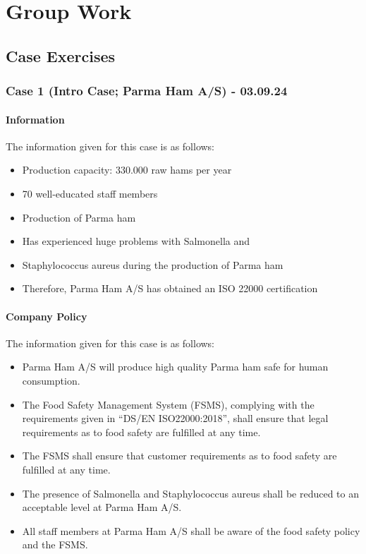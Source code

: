 \chapter{Group Work}

\section{Case Exercises}

\subsection{Case 1 (Intro Case; Parma Ham A/S) - 03.09.24}

\subsubsection*{Information}
\begin{highlight}
    The information given for this case is as follows:

\begin{itemize}
\item Production capacity: 330.000 raw hams per year
\item 70 well-educated staff members
\item Production of Parma ham
\item Has experienced huge problems with Salmonella and
\item Staphylococcus aureus during the production of Parma ham
\item Therefore, Parma Ham A/S has obtained an ISO 22000
certification

\end{itemize}
\end{highlight}

\subsubsection*{Company Policy}
\begin{highlight}
    The information given for this case is as follows:

\begin{itemize}
\item Parma Ham A/S will produce high quality Parma ham safe for human consumption.
\item The Food Safety Management System (FSMS), complying with the requirements given in “DS/EN ISO22000:2018”, shall ensure that legal requirements as to food safety are fulfilled at any time.
\item The FSMS shall ensure that customer requirements as to food safety are fulfilled at any time.
\item The presence of Salmonella and Staphylococcus aureus shall be reduced to an acceptable level at Parma Ham A/S.
\item All staff members at Parma Ham A/S shall be aware of the food safety policy and the FSMS.

\end{itemize}
\end{highlight}

